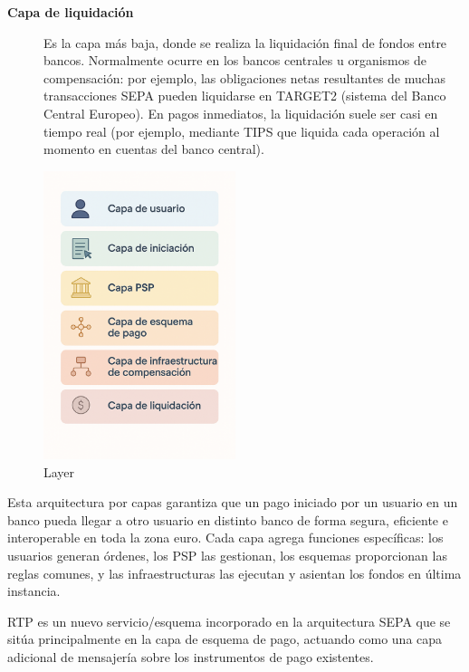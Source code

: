 \begin{description}
  \item[\textbf{Capa de liquidación}] 
    Es la capa más baja, donde se realiza la liquidación final de fondos entre bancos. Normalmente ocurre en los bancos centrales u organismos de compensación: por ejemplo, las obligaciones netas resultantes de muchas transacciones SEPA pueden liquidarse en TARGET2 (sistema del Banco Central Europeo). En pagos inmediatos, la liquidación suele ser casi en tiempo real (por ejemplo, mediante TIPS que liquida cada operación al momento en cuentas del banco central).
\end{description}

\begin{figure}[H]
  \centering
  \includegraphics[width=0.5\textwidth]{Imagenes/esq1.png}
  \caption{Layer}
  \label{fig:4corner}
\end{figure}

Esta arquitectura por capas garantiza que un pago iniciado por un usuario en un banco pueda llegar a otro usuario en distinto banco de forma segura, eficiente e interoperable en toda la zona euro. Cada capa agrega funciones específicas: los usuarios generan órdenes, los PSP las gestionan, los esquemas proporcionan las reglas comunes, y las infraestructuras las ejecutan y asientan los fondos en última instancia.

RTP es un nuevo servicio/esquema incorporado en la arquitectura SEPA que se sitúa principalmente en la capa de esquema de pago, actuando como una capa adicional de mensajería sobre los instrumentos de pago existentes.

